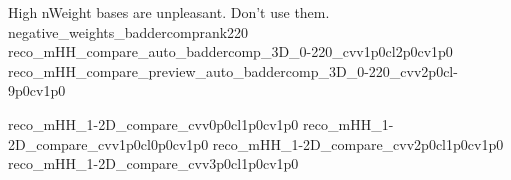 
{ High nWeight bases are unpleasant. Don't use them. }
{negative_weights_baddercomprank220}
{reco_mHH_compare_auto_baddercomp_3D_0-220_cvv1p0cl2p0cv1p0}
{reco_mHH_compare_preview_auto_baddercomp_3D_0-220_cvv2p0cl-9p0cv1p0}

{reco_mHH_1-2D_compare_cvv0p0cl1p0cv1p0}
{reco_mHH_1-2D_compare_cvv1p0cl0p0cv1p0}
{reco_mHH_1-2D_compare_cvv2p0cl1p0cv1p0}
{reco_mHH_1-2D_compare_cvv3p0cl1p0cv1p0}
